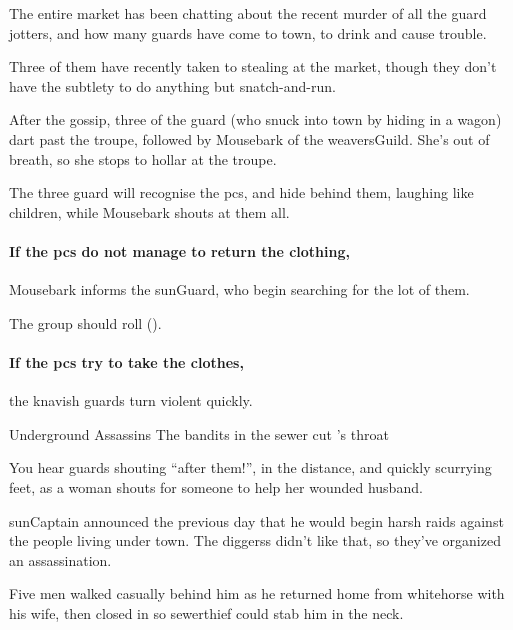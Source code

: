 \begin{exampletext}
  The entire market has been chatting about the recent murder of all the \gls{guard} \glspl{jotter}, and how many \glspl{guard} have come to town, to drink and cause trouble.

  Three of them have recently taken to stealing at the market, though they don't have the subtlety to do anything but snatch-and-run.
\end{exampletext}

After the gossip, three of the \gls{guard} (who snuck into town by hiding in a wagon) dart past the troupe, followed by Mousebark of the \gls{weaversGuild}.
She's out of breath, so she stops to hollar at the troupe.

The three \gls{guard} will recognise the \glspl{pc}, and hide behind them, laughing like children, while Mousebark shouts at them all.


\paragraph{If the \glspl{pc} do not manage to return the clothing,}
Mousebark informs the \gls{sunGuard}, who begin searching for the lot of them.

The group should roll  (\tn[8]).

\paragraph{If the \glspl{pc} try to take the clothes,}
the knavish \glspl{guard} turn violent quickly.


{Underground Assassins}%
{The bandits in the sewer cut 's throat}%

\begin{boxtext}
  You hear guards shouting ``after them!'', in the distance, and quickly scurrying feet, as a woman shouts for someone to help her wounded husband.
\end{boxtext}

\begin{exampletext}
  \Gls{sunCaptain} announced the previous day that he would begin harsh raids against the people living under \gls{town}.
  The \glspl{diggers} didn't like that, so they've organized an assassination.

  Five men walked casually behind him as he returned home from \gls{whitehorse} with his wife, then closed in so \gls{sewerthief} could stab him in the neck.
\end{exampletext}

